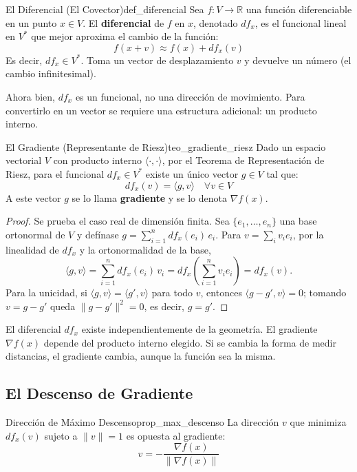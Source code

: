 \documentclass[11pt, a4paper]{article}
\begin{document}
\begin{definicion}{El Diferencial (El Covector)}{def_diferencial}
Sea $f: V \to \mathbb{R}$ una función diferenciable en un punto $x \in V$. El \textbf{diferencial} de $f$ en $x$, denotado $df_x$, es el funcional lineal en $V^*$ que mejor aproxima el cambio de la función:
\[
f(x + v) \approx f(x) + df_x(v)
\]
Es decir, $df_x \in V^*$. Toma un vector de desplazamiento $v$ y devuelve un número (el cambio infinitesimal).
\end{definicion}

Ahora bien, $df_x$ es un funcional, no una dirección de movimiento. Para convertirlo en un vector se requiere una estructura adicional: un producto interno.

\begin{teorema}{El Gradiente (Representante de Riesz)}{teo_gradiente_riesz}
Dado un espacio vectorial $V$ con producto interno $\langle \cdot, \cdot \rangle$, por el Teorema de Representación de Riesz, para el funcional $df_x \in V^*$ existe un único vector $g \in V$ tal que:
\[
df_x(v) = \langle g, v \rangle \quad \forall v \in V
\]
A este vector $g$ se lo llama \textbf{gradiente} y se lo denota $\nabla f(x)$.
\end{teorema}

\begin{proof}
Se prueba el caso real de dimensión finita. Sea $\{e_1, \dots, e_n\}$ una base ortonormal de $V$ y defínase $g = \sum_{i=1}^n df_x(e_i)\, e_i$. Para $v = \sum_i v_i e_i$, por la linealidad de $df_x$ y la ortonormalidad de la base,
\[
\langle g, v \rangle = \sum_{i=1}^n df_x(e_i)\, v_i = df_x\!\left( \sum_{i=1}^n v_i e_i \right) = df_x(v).
\]
Para la unicidad, si $\langle g, v \rangle = \langle g', v \rangle$ para todo $v$, entonces $\langle g - g', v \rangle = 0$; tomando $v = g - g'$ queda $\|g - g'\|^2 = 0$, es decir, $g = g'$.
\end{proof}

\obs
El diferencial $df_x$ existe independientemente de la geometría. El gradiente $\nabla f(x)$ depende del producto interno elegido. Si se cambia la forma de medir distancias, el gradiente cambia, aunque la función sea la misma.

\subsection{El Descenso de Gradiente}

\begin{proposicion}{Dirección de Máximo Descenso}{prop_max_descenso}
La dirección $v$ que minimiza $df_x(v)$ sujeto a $\|v\|=1$ es opuesta al gradiente:
\[
v = -\frac{\nabla f(x)}{\|\nabla f(x)\|}
\]
\end{proposicion}
\end{document}
